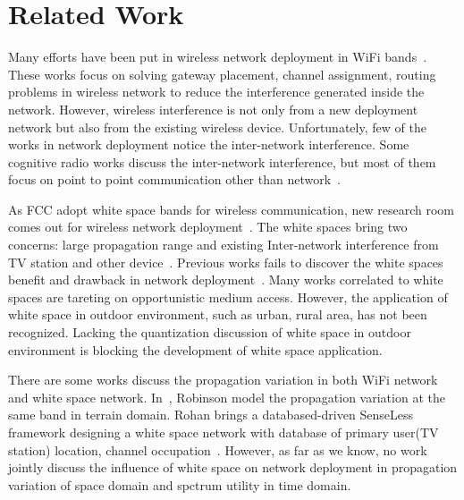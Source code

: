 \section{Related Work}
\label{sec:related}

Many efforts have been put in wireless network deployment in WiFi bands~\cite{he2008optimizing,ramachandran2006interference,akyildiz2006next}.
These works focus on solving gateway placement, channel assignment, routing 
problems in wireless network to reduce the interference generated inside the network.
However, wireless interference is not only from a new deployment network but also from the
existing wireless device. Unfortunately, few of the works in network deployment notice the 
inter-network interference. Some cognitive radio works discuss the inter-network
interference, but most of them focus on point to point communication other than network~\cite{cabric2004implementation}.

As FCC adopt white space bands for wireless communication, new research room comes out 
for wireless network deployment~\cite{fccwhitespace}. The white spaces bring two
concerns: large propagation range and existing Inter-network interference from 
TV station and other device~\cite{cui2013leveraging,bahl2009white}.
Previous works fails to discover the white spaces benefit and drawback in network deployment~\cite{akyildiz2005wireless}.
Many works correlated to white spaces are tareting on opportunistic medium access.
However, the application of white space in outdoor environment, such as urban, rural area, has not been recognized.
Lacking the quantization discussion of white space in outdoor environment is blocking the development of white space
application.

There are some works discuss the propagation variation in both WiFi network and white space network.
In~\cite{robinson2010deploying}, Robinson model the propagation variation at the same band in terrain 
domain. Rohan brings a databased-driven SenseLess framework designing a white space network with 
database of primary user(TV station) location, channel occupation~\cite{murty2012senseless}. 
However, as far as we know, no work jointly discuss the influence of white space on network deployment in 
propagation variation of space domain and spctrum utility in time domain.

